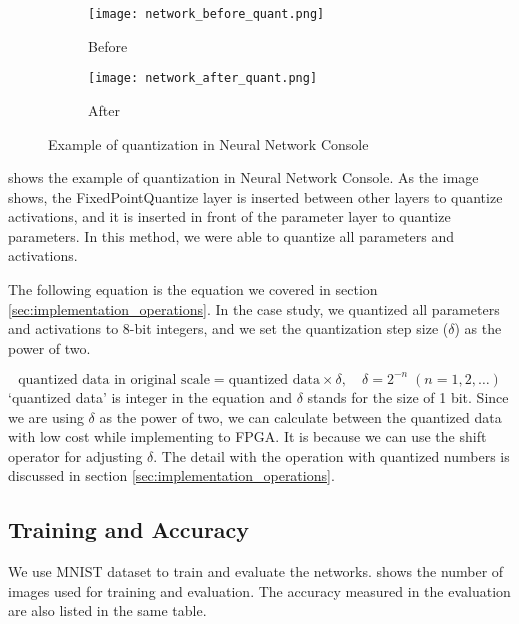 \begin{figure}[tbp]
  \centering
  \begin{subfigure}[b]{0.331\textwidth}
    \centering
    \texttt{[image: network\_before\_quant.png]}
    \caption{Before}
    \label{subfig:before_quant_nnc}
  \end{subfigure}
  \quad %
  \begin{subfigure}[b]{0.64\textwidth}
    \centering
    \texttt{[image: network\_after\_quant.png]}
    \caption{After}
    \label{subfig:after_quant_nnc}
  \end{subfigure}

  \caption{Example of quantization in Neural Network Console}%
  \label{fig:quant_in_nnc}
\end{figure}

 shows the example of quantization in Neural Network Console. As the image shows, the FixedPointQuantize layer is inserted between other layers to quantize activations, and it is inserted in front of the parameter layer to quantize parameters. In this method, we were able to quantize all parameters and activations.

The following equation is the equation we covered in section \ref{sec:implementation_operations}. In the case study, we quantized all parameters and activations to 8-bit integers, and we set the quantization step size ($\delta$) as the power of two.

\[
\textrm{quantized data in original scale} = \textrm{quantized data} \times \delta, \quad \delta = 2^{-n} \; \left( n = 1, 2, \ldots\right)
\]
`quantized data' is integer in the equation and $\delta$ stands for the size of 1 bit.
Since we are using $\delta$ as the power of two, we can calculate between the quantized data with low cost while implementing to FPGA. It is because we can use the shift operator for adjusting $\delta$. The detail with the operation with quantized numbers is discussed in section \ref{sec:implementation_operations}.



\subsection{Training and Accuracy} \label{sec:training_and_accuracy}
We use MNIST dataset \cite{mnist} to train and evaluate the networks.  shows the number of images used for training and evaluation. The accuracy measured in the evaluation are also listed in the same table.

